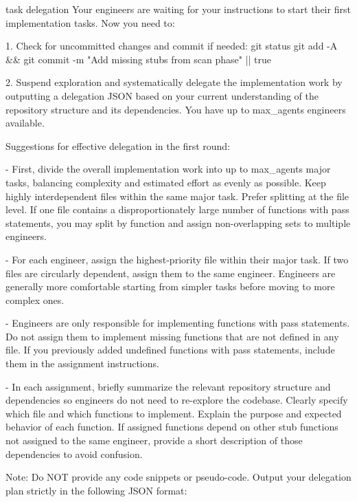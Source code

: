 \begin{promptbox}{task delegation}
Your engineers are waiting for your instructions to start their first implementation tasks. Now you need to:

  1. Check for uncommitted changes and commit if needed:
     git status
     git add -A && git commit -m "Add missing stubs from scan phase" || true

  2. Suspend exploration and systematically delegate the implementation work
     by outputting a delegation JSON based on your current understanding
     of the repository structure and its dependencies.
     You have up to {max_agents} engineers available.

Suggestions for effective delegation in the first round:

  - First, divide the overall implementation work into up to {max_agents}
    major tasks, balancing complexity and estimated effort as evenly as possible. Keep highly interdependent files within the same major task. Prefer splitting at the file level. If one file contains a disproportionately large number of functions with pass statements, you may split by function and assign non-overlapping sets to multiple engineers.

  - For each engineer, assign the highest-priority file within their major task. If two files are circularly dependent, assign them to the same engineer. Engineers are generally more comfortable starting from simpler tasks before moving to more complex ones.

  - Engineers are only responsible for implementing functions with pass
    statements. Do not assign them to implement missing functions that are not defined in any file. If you previously added undefined functions with pass statements, include them in the assignment instructions.

  - In each assignment, briefly summarize the relevant repository structure and dependencies so engineers do not need to re-explore the codebase. Clearly specify which file and which functions to implement. Explain the purpose and expected behavior of each function. If assigned functions depend on other stub functions not assigned to the same engineer, provide a short description of those dependencies to avoid confusion.

Note: Do NOT provide any code snippets or pseudo-code.
Output your delegation plan strictly in the following JSON format:


\end{promptbox}
